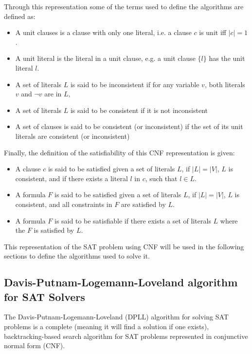 Through this representation some of the terms used to define the algorithms are defined as:
\begin{itemize}
  \item A unit clauses is a clause with only one literal, i.e. a clause $c$ is unit iff $|c| = 1$.
  \item A unit literal is the literal in a unit clause, e.g. a unit clause $\{l\}$ has the unit literal $l$.
  \item A set of literals $L$ is said to be inconsistent if for any variable $v$, both literals $v$ and $\neg v$ are in $L$,
  \item A set of literals $L$ is said to be consistent if it is not inconsistent
  \item A set of clauses is said to be consistent (or inconsistent) if the set of its unit literals are consistent (or inconsistent)
\end{itemize}

Finally, the definition of the satisfiability of this CNF representation is given:
\begin{itemize}
  \item A clause $c$ is said to be satisfied given a set of literals $L$, if $|L| = |V|$, $L$ is consistent, and if there exists a literal $l$ in $c$, such that $l \in L$.
  \item A formula $F$ is said to be satisfied given a set of literals $L$, if $|L| = |V|$, $L$ is consistent, and all constraints in $F$ are satisfied by $L$.
  \item A formula $F$ is said to be satisfiable if there exists a set of literals $L$ where the $F$ is satisfied by $L$.
\end{itemize}

This representation of the SAT problem using CNF will be used in the following sections to define the algorithms used to solve it.

\subsection{Davis-Putnam-Logemann-Loveland algorithm for SAT Solvers}
The Davis-Putnam-Logemann-Loveland (DPLL) algorithm \citep{Davis1960, davis1962machine} for solving SAT problems is a complete (meaning it will find a solution if one exists), 
backtracking-based search algorithm for SAT problems represented in conjunctive normal form (CNF).

